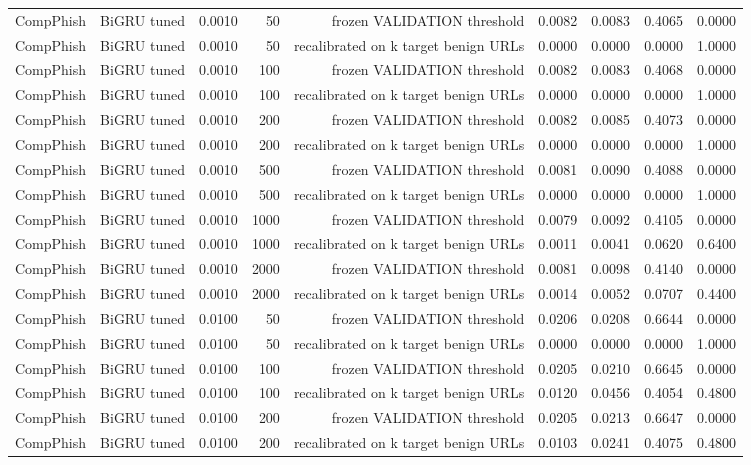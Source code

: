 \begin{table}[t]
\begin{tabular}{llrrrrrrr}
CompPhish & BiGRU tuned & 0.0010 & 50 & frozen VALIDATION threshold & 0.0082 & 0.0083 & 0.4065 & 0.0000 \\
CompPhish & BiGRU tuned & 0.0010 & 50 & recalibrated on k target benign URLs & 0.0000 & 0.0000 & 0.0000 & 1.0000 \\
CompPhish & BiGRU tuned & 0.0010 & 100 & frozen VALIDATION threshold & 0.0082 & 0.0083 & 0.4068 & 0.0000 \\
CompPhish & BiGRU tuned & 0.0010 & 100 & recalibrated on k target benign URLs & 0.0000 & 0.0000 & 0.0000 & 1.0000 \\
CompPhish & BiGRU tuned & 0.0010 & 200 & frozen VALIDATION threshold & 0.0082 & 0.0085 & 0.4073 & 0.0000 \\
CompPhish & BiGRU tuned & 0.0010 & 200 & recalibrated on k target benign URLs & 0.0000 & 0.0000 & 0.0000 & 1.0000 \\
CompPhish & BiGRU tuned & 0.0010 & 500 & frozen VALIDATION threshold & 0.0081 & 0.0090 & 0.4088 & 0.0000 \\
CompPhish & BiGRU tuned & 0.0010 & 500 & recalibrated on k target benign URLs & 0.0000 & 0.0000 & 0.0000 & 1.0000 \\
CompPhish & BiGRU tuned & 0.0010 & 1000 & frozen VALIDATION threshold & 0.0079 & 0.0092 & 0.4105 & 0.0000 \\
CompPhish & BiGRU tuned & 0.0010 & 1000 & recalibrated on k target benign URLs & 0.0011 & 0.0041 & 0.0620 & 0.6400 \\
CompPhish & BiGRU tuned & 0.0010 & 2000 & frozen VALIDATION threshold & 0.0081 & 0.0098 & 0.4140 & 0.0000 \\
CompPhish & BiGRU tuned & 0.0010 & 2000 & recalibrated on k target benign URLs & 0.0014 & 0.0052 & 0.0707 & 0.4400 \\
CompPhish & BiGRU tuned & 0.0100 & 50 & frozen VALIDATION threshold & 0.0206 & 0.0208 & 0.6644 & 0.0000 \\
CompPhish & BiGRU tuned & 0.0100 & 50 & recalibrated on k target benign URLs & 0.0000 & 0.0000 & 0.0000 & 1.0000 \\
CompPhish & BiGRU tuned & 0.0100 & 100 & frozen VALIDATION threshold & 0.0205 & 0.0210 & 0.6645 & 0.0000 \\
CompPhish & BiGRU tuned & 0.0100 & 100 & recalibrated on k target benign URLs & 0.0120 & 0.0456 & 0.4054 & 0.4800 \\
CompPhish & BiGRU tuned & 0.0100 & 200 & frozen VALIDATION threshold & 0.0205 & 0.0213 & 0.6647 & 0.0000 \\
CompPhish & BiGRU tuned & 0.0100 & 200 & recalibrated on k target benign URLs & 0.0103 & 0.0241 & 0.4075 & 0.4800 \\

\end{tabular}
\end{table}
